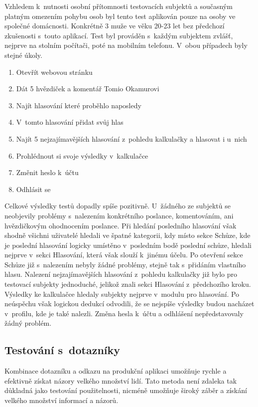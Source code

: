 \par Vzhledem k~nutnosti osobní přítomnosti testovacích subjektů a současným platným omezením pohybu osob byl tento test aplikován pouze na osoby ve společné domácnosti. Konkrétně 3 muže ve věku 20-23 let bez předchozí zkušenosti s~touto aplikací. Test byl prováděn s~každým subjektem zvlášť, nejprve na stolním počítači, poté na mobilním telefonu. V~obou případech byly stejné úkoly. 
\begin{enumerate}
    \item Otevřít webovou stránku
    \item Dát 5 hvězdiček a komentář Tomio Okamurovi
    \item Najít hlasování které proběhlo naposledy
    \item V~tomto hlasování přidat svůj hlas
    \item Najít 5 nejzajímavějších hlasování z~pohledu kalkulačky a hlasovat i u~nich
    \item Prohlédnout si svoje výsledky v~kalkulačce
    \item Změnit heslo k~účtu
    \item Odhlásit se
\end{enumerate}

Celkové výsledky testů dopadly spíše pozitivně. U~žádného ze subjektů se neobjevily problémy s~nalezením konkrétního poslance, komentováním, ani hvězdičkovým ohodnocením poslance. Při hledání posledního hlasování však shodně všichni uživatelé hledali ve špatné kategorii, kdy místo sekce Schůze, kde je poslední hlasování logicky umístěno v~posledním bodě poslední schůze, hledali nejprve v~sekci Hlasování, která však slouží k~jinému účelu. Po otevření sekce Schůze již s~nalezením nebyly žádné problémy, stejně tak s~přidáním vlastního hlasu. Nalezení nejzajímavějších hlasování z~pohledu kalkulačky již bylo pro testovací subjekty jednoduché, jelikož znali sekci Hlasování z~předchozího kroku. Výsledky ke kalkulačce hledaly subjekty nejprve v~modulu pro hlasování. Po neúspěchu však logickou dedukcí odvodili, že se nejspíše výsledky budou nacházet v~profilu, kde je také nalezli. Změna hesla k~účtu a odhlášení nepředstavovaly žádný problém.\\



\subsection{Testování s~dotazníky}
Kombinace dotazníku a odkazu na produkční aplikaci umožňuje rychle a efektivně získat názory velkého množství lidí. Tato metoda není zdaleka tak důkladná jako testování použitelnosti, nicméně umožňuje široký záběr a získání velkého množství informací a názorů.

